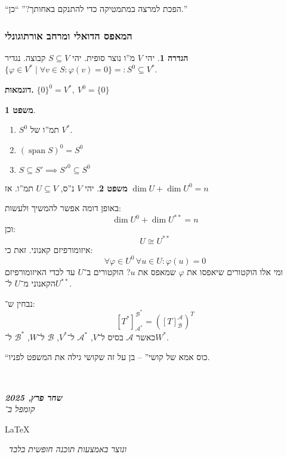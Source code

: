 \documentclass[a4paper]{article}
\newcommand\en[1] {\begin{otherlanguage}{english}#1\end{otherlanguage}}
\newcommand\ndoc  {\dotfill \\ \vfil {\begin{center}
			{\textbf{\textit{שחר פרץ, 2025}} \\
				\scriptsize \textit{קומפל ב־}\en{\LaTeX}\,\textit{ ונוצר באמצעות תוכנה חופשית בלבד}}
	\end{center}} \vfil	}
\newcommand\ac    {\mathcal{A}}
\newcommand\bc    {\mathcal{B}}
\DeclareMathOperator{\Sp}      {span}
\newcommand\co        {\colon}
\renewcommand\phi     {\varphi}
\theoremstyle{definition}
\newtheorem{Theorem}{משפט}
\newtheorem{definition}{הגדרה}
\newcommand\theo  [1] {\begin{Theorem}#1\end{Theorem}}
\newcommand\defi  [1] {\begin{definition}#1\end{definition}}
\begin{document}
	``הפכת למרצה במתמטיקה כדי להתנקם באחותך?'' ``כן.''
	
	\subsubsection{המאפס הדואלי ומרחב אורתוגונלי}
	\defi{יהי $V$ מ''ו נוצר סופית. יהי $S \subseteq V$ קבוצה. נגדיר $\{\phi \in V^* \mid \forall v \in S \co \phi(v) = 0\} =: S^0 \subseteq V^*$. }
	
	\textbf{דוגמאות. } \hfil $\{0\}^0 = V^*, \ V^0 = \{0\}$
	
	\theo{\,
		\begin{enumerate}
			\item $S^0$ תמ''ו של $V^*$. 
			\item \hfil $(\Sp S)^0 = S^0$
			\item \hfil $S \subseteq S' \implies S'^0 \subseteq S^0$
	\end{enumerate}}
	
	\theo{יהי $V$ נ''ס, $U \subseteq V$ תמ''ו. אז $\dim U + \dim U^0 = n$}
	באופן דומה אפשר להמשיך ולעשות: 
	\[ \dim U^0 + \dim U^{**} = n \]
	וכן: 
	\[ U \cong U^{**} \]
	איזומורפיזם קאנוני. זאת כי:
	\[ \forall \phi \in U^0 \, \forall u \in U \co \phi(u) = 0 \]
	ומי אלו הוקטורים שיאפסו את $\phi$ שמאפס את $u$? הוקטורים ב־$U$ עד לכדי האיזומורפיזם הקאנוני מ־$U$ ל־$U^{**}$. 
	
	נבחין ש־: 
	\[ [T^*]^{\bc^*}_{\ac^*} = ([T]^{\ac}_{\bc})^T \]
	כאשר $\ac$ בסיס ל־$V$, $\ac^*$ ל־$V^*$, $\bc$ ל־$W$, $\bc^*$ ל־$W^*$. 
	
	``כוס אמא של קושי'' – בן על זה שקושי גילה את המשפט לפניו. 
	
	\ndoc
	
	
	
	
	
\end{document}
